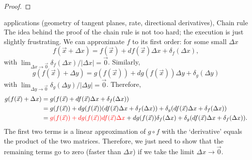 \begin{proof}
    \todo
\end{proof}
\todo applications (geometry of tangent planes, rate, directional derivatives), Chain rule
The idea behind the proof of the chain rule is not too hard; the execution is just slightly frustrating. 
We can approximate $f$ to its first order: for some small $\Delta x$ \[
    f(\vec{x}+\Delta x)  = f(\vec{x}) + df(\vec{x}) \Delta x + \delta_f(\Delta x),
\]
with $\lim_{\Delta x\to \vec{0}} \delta_f(\Delta x) / |\Delta x| = \vec{0} $. Similarly, \[
   g( f(\vec{x})+\Delta y)  = g(f(\vec{x})) + dg(f(\vec{x})) \Delta y + \delta_g(\Delta y)
\]
with $\lim_{\Delta y\to \vec{0}} \delta_g(\Delta y) / |\Delta y| = \vec{0} $.
Therefore,\begin{align*}
    g(f(\vec{x})+ \Delta x) &= g(f(\vec{x}) + df(\vec{x}) \Delta x + \delta_f(\Delta x))\\
    &= g(f(\vec{x}))+ dg(f(\vec{x}))(df(\vec{x}) \Delta x + \delta_f(\Delta x))+\delta_g(df(\vec{x}) \Delta x + \delta_f(\Delta x))\\
    &= \textcolor{red}{g(f(\vec{x}))+ dg(f(\vec{x}))df(\vec{x}) \Delta x }+ dg(f(\vec{x}))\delta_f(\Delta x)+\delta_g(df(\vec{x}) \Delta x + \delta_f(\Delta x)).
\end{align*}
The first two terms is a linear approximation of $g\circ f$ with the `derivative' equals the product of the two matrices. Therefore, we just need to show that the remaining terms go to zero (faster than $\Delta x$) if we take the limit $\Delta x\to\vec{0}$.
